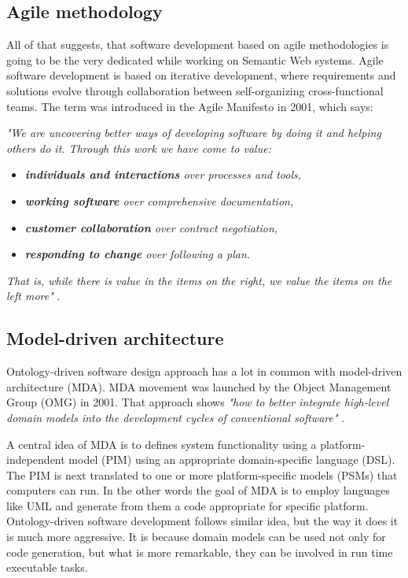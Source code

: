 \subsection{Agile methodology}
\label{sub:agileMethodology}

All of that suggests, that software development based on agile methodologies is going to be the very dedicated while working on Semantic Web systems. Agile software development is based on iterative development, where requirements and solutions evolve through collaboration between self-organizing cross-functional teams. The term was introduced in the Agile Manifesto in 2001, which says:

\newpage

\noindent \textit{"We are uncovering better ways of developing software by doing it and helping others do it. Through this work we have come to value:}

\begin{itemize}
    \setlength{\itemsep}{0cm}
    \setlength{\parskip}{0cm}

    \item[] \textit{\textbf{individuals and interactions} over processes and tools,}
    \item[] \textit{\textbf{working software} over comprehensive documentation,}
    \item[] \textit{\textbf{customer collaboration} over contract negotiation,}
    \item[] \textit{\textbf{responding to change} over following a plan.}
\end{itemize}

\noindent \textit{That is, while there is value in the items on the right, we value the items on the left more"} \cite{AgileManifesto}.

\subsection{Model-driven architecture}
\label{sub:modelDrivenArchitecture}

Ontology-driven software design approach has a lot in common with model-driven architecture (MDA). MDA movement was launched by the Object Management Group (OMG) in 2001. That approach shows \textit{"how to better integrate high-level domain models into the development cycles of conventional software"} \cite{OntDrivDev}.

A central idea of MDA is to defines system functionality using a platform-independent model (PIM) using an appropriate domain-specific language (DSL). The PIM is next translated to one or more platform-specific models (PSMs) that computers can run. In the other words the goal of MDA is to employ languages like UML and generate from them a code appropriate for specific platform. Ontology-driven software development follows similar idea, but the way it does it is much more aggressive. It is because domain models can be used not only for code generation, but what is more remarkable, they can be involved in run time executable tasks. 

